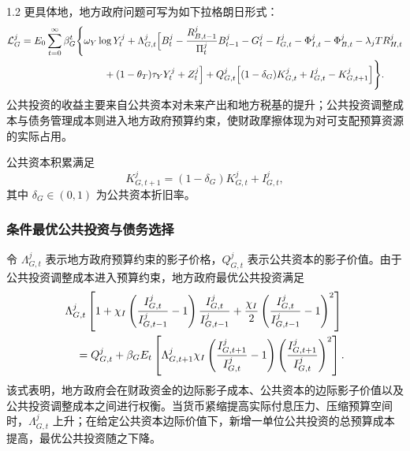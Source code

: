\documentclass[12pt,UTF8]{ctexart}
\begin{document}
\begin{spacing}{1.2}
		更具体地，地方政府问题可写为如下拉格朗日形式：
		\begin{align}
			\mathcal L_G^j
			=E_0\sum_{t=0}^{\infty}\beta_G^t
			\Bigg\{
			&\omega_Y\log Y_t^j
			+\Lambda_{G,t}^j
			\Big[
			B_t^j
			-\frac{R_{B,t-1}^j}{\Pi_t^j}B_{t-1}^j
			-G_t^j-I_{G,t}^j-\Phi_{I,t}^j-\Phi_{B,t}^j
			-\lambda_jTR_{H,t}^j \notag\\
			&\qquad
			+(1-\theta_T)\tau_Y Y_t^j+Z_t^j
			\Big]
			+Q_{G,t}^j
			\Big[
			(1-\delta_G)K_{G,t}^j+I_{G,t}^j-K_{G,t+1}^j
			\Big]
			\Bigg\}.
			\label{eq:gov_lagrangian}
		\end{align}
		公共投资的收益主要来自公共资本对未来产出和地方税基的提升；公共投资调整成本与债务管理成本则进入地方政府预算约束，使财政摩擦体现为对可支配预算资源的实际占用。

		公共资本积累满足
		\begin{equation}
			K_{G,t+1}^j
			=
			(1-\delta_G)K_{G,t}^j
			+I_{G,t}^j,
			\label{eq:KG_law}
		\end{equation}
		其中 $\delta_G\in(0,1)$ 为公共资本折旧率。
		
		\subsubsection{条件最优公共投资与债务选择}
		
		令 $\Lambda_{G,t}^j$ 表示地方政府预算约束的影子价格，$Q_{G,t}^j$ 表示公共资本的影子价值。由于公共投资调整成本进入预算约束，地方政府最优公共投资满足
		\begin{align}
			&\Lambda_{G,t}^j
			\left[
			1+\chi_I
			\left(
			\frac{I_{G,t}^j}{I_{G,t-1}^j}-1
			\right)
			\frac{I_{G,t}^j}{I_{G,t-1}^j}
			+\frac{\chi_I}{2}
			\left(
			\frac{I_{G,t}^j}{I_{G,t-1}^j}-1
			\right)^2
			\right] \notag\\
			&\quad =
			Q_{G,t}^j
			+\beta_G E_t
			\left[
			\Lambda_{G,t+1}^j\chi_I
			\left(
			\frac{I_{G,t+1}^j}{I_{G,t}^j}-1
			\right)
			\left(
			\frac{I_{G,t+1}^j}{I_{G,t}^j}
			\right)^2
			\right].
			\label{eq:IG_FOC}
		\end{align}
		该式表明，地方政府会在财政资金的边际影子成本、公共资本的边际影子价值以及公共投资调整成本之间进行权衡。当货币紧缩提高实际付息压力、压缩预算空间时，$\Lambda_{G,t}^j$ 上升；在给定公共资本边际价值下，新增一单位公共投资的总预算成本提高，最优公共投资随之下降。
		

\end{spacing}
\end{document}
